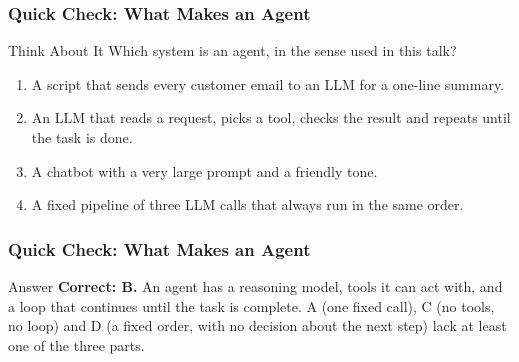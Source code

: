 \begin{frame}[fragile]\frametitle{Quick Check: What Makes an Agent}
\begin{block}{Think About It}
Which system is an agent, in the sense used in this talk?
\begin{enumerate}
  \item[A.] A script that sends every customer email to an LLM for a one-line summary.
  \item[B.] An LLM that reads a request, picks a tool, checks the result and repeats until the task is done.
  \item[C.] A chatbot with a very large prompt and a friendly tone.
  \item[D.] A fixed pipeline of three LLM calls that always run in the same order.
\end{enumerate}
\end{block}
\end{frame}

\begin{frame}[fragile]\frametitle{Quick Check: What Makes an Agent}
\begin{block}{Answer}
\textbf{Correct: B.} An agent has a reasoning model, tools it can act with, and a loop that continues until
the task is complete. A (one fixed call), C (no tools, no loop) and D (a fixed order, with no decision
about the next step) lack at least one of the three parts.
\end{block}
\end{frame}
